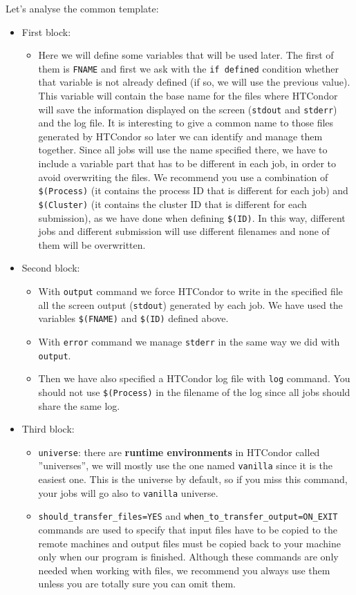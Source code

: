 \documentclass[a4paper,10pt]{article}
\begin{document}
\begin{itemize}
Let's analyse the common template: 
\begin{itemize}
\item First block:
\begin{itemize}
\item Here we will define some variables that will be used later. The first of
them is \texttt{FNAME} and first we ask with the \texttt{if defined} condition whether
that variable is not already defined (if so, we will use the previous
value). This variable will contain the base name for the files where
HTCondor will save the information displayed on the screen (\texttt{stdout} and
\texttt{stderr}) and the log file. It is interesting to give a common name to
those files generated by HTCondor so later we can identify and manage them
together. Since all jobs will use the name specified there, we have to
include a variable part that has to be different in each job, in order to
avoid overwriting the files. We recommend you use a combination of
\texttt{\$(Process)} (it contains the process ID that is different for each job)
and \texttt{\$(Cluster)} (it contains the cluster ID that is different for each
submission), as we have done when defining \texttt{\$(ID)}. In this way, different
jobs and different submission will use different filenames and none of
them will be overwritten.
\end{itemize}
\item Second block:
\begin{itemize}
\item With \texttt{output} command we force HTCondor to write in the specified file all
the screen output (\texttt{stdout}) generated by each job. We have used the
variables \texttt{\$(FNAME)} and \texttt{\$(ID)} defined above.
\item With \texttt{error} command we manage \texttt{stderr} in the same way we did with
\texttt{output}.
\item Then we have also specified a HTCondor log file with \texttt{log} command. You
should not use \texttt{\$(Process)} in the filename of the log since all jobs
should share the same log.
\end{itemize}
\item Third block:
\begin{itemize}
\item \texttt{universe}: there are \textbf{runtime environments}
in HTCondor called ''universes'', we will mostly use the one named
\texttt{vanilla} since it is the easiest one. This is the universe by default, so
if you miss this command, your jobs will go also to \texttt{vanilla} universe.
\item \texttt{should\_transfer\_files=YES} and \texttt{when\_to\_transfer\_output=ON\_EXIT} commands
are used to specify that input files have to be copied to the remote
machines and output files must be copied back to your machine only when
our program is finished. Although these commands are only needed when
working with files, we recommend you always use them unless you are
totally sure you can omit them.
\end{itemize}
\end{itemize}
\end{itemize}
\end{document}
